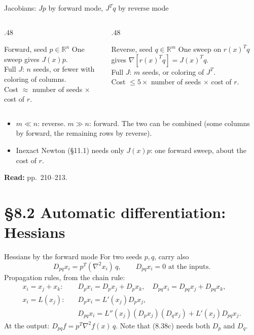\documentclass[12pt,aspectratio=169]{beamer}
\newcommand{\readpp}[1]{{\color{red!80!black}\textbf{Read:} #1}}
\newcommand{\R}{\mathbb{R}}
\begin{document}
\begin{frame}{Jacobians: $Jp$ by forward mode, $J^Tq$ by reverse mode}
  \begin{columns}[T]
    \begin{column}{.48\textwidth}
      \begin{block}{Forward, seed $p\in\R^n$}
        One sweep gives $J(x)p$.\\
        Full $J$: $n$ seeds, or fewer with coloring of columns.\\
        Cost $\approx$ number of seeds $\times$ cost of $r$.
      \end{block}
    \end{column}
    \begin{column}{.48\textwidth}
      \begin{block}{Reverse, seed $q\in\R^m$}
        One sweep on $r(x)^Tq$ gives
        $\nabla[r(x)^Tq] = J(x)^Tq$.\\
        Full $J$: $m$ seeds, or coloring of $J^T$.\\
        Cost $\le 5\times$ number of seeds $\times$ cost of $r$.
      \end{block}
    \end{column}
  \end{columns}
  \vspace{1ex}
  \begin{itemize}
    \item $m\ll n$: reverse. $m\gg n$: forward. The two can be combined (some columns by forward, the remaining rows by reverse).
    \item Inexact Newton (\S11.1) needs only $J(x)p$: \alert{one forward sweep}, about the cost of $r$.
  \end{itemize}
  \readpp{pp.~210--213.}
\end{frame}

\section{\S8.2 Automatic differentiation: Hessians}

\begin{frame}{Hessians by the forward mode}
  For two seeds $p,q$, carry also
  \begin{equation}
    D_{pq}x_i = p^T(\nabla^2x_i)\,q, \qquad D_{pq}x_i=0 \text{ at the inputs}. \tag{8.36}
  \end{equation}
  Propagation rules, from the chain rule:
  \begin{align}
    x_i=x_j+x_k:&\quad D_px_i=D_px_j+D_px_k,\quad D_{pq}x_i=D_{pq}x_j+D_{pq}x_k, \tag{8.37}\\
    x_i=L(x_j):&\quad D_px_i=L'(x_j)D_px_j, \tag{8.38b}\\
    &\quad D_{pq}x_i=L''(x_j)(D_px_j)(D_qx_j)+L'(x_j)D_{pq}x_j. \tag{8.38c}
  \end{align}
  At the output: $D_{pq}f = p^T\nabla^2 f(x)\,q$.
  Note that (8.38c) needs both $D_p$ and $D_q$.
\end{frame}
\end{document}
